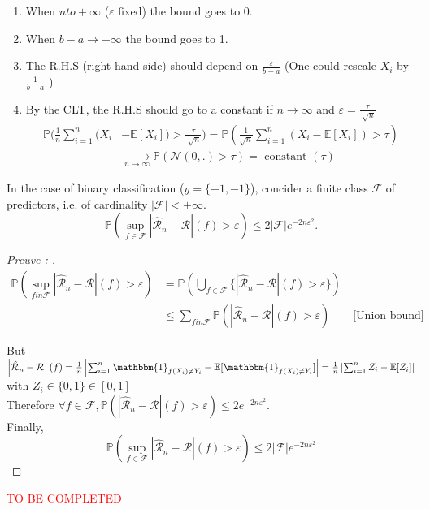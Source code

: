 \begin{enumerate}
    \item When $n to + \infty $ ($\varepsilon $ fixed) the bound goes to 0.
    \item When $b -a \to + \infty $ the bound goes to 1.
    \item The R.H.S (right hand side) should depend on $\frac{\varepsilon }{b-a}$ (One could rescale $X_i$ by $\frac{1}{b-a}$ )
    \item By the CLT, the R.H.S should go to a constant if $n \to \infty $ and $\varepsilon = \frac{\tau }{\sqrt[]{n}}$ \begin{align*}
        \mathbb{P} ( \frac{1}{n} \sum_{i=1}^{n} (X_i &- \mathbb{E}[X_i]) >  \frac{\tau }{\sqrt[]{n}}) =  \mathbb{P}( \frac{1}{\sqrt{n}} \sum_{i=1}^{n} (X_i - \mathbb{E}[X_i]) >  \tau) \\
        & \xrightarrow[n \to \infty]{} \mathbb{P}(\mathcal{N}(0, . ) > \tau ) = \text{ constant }(\tau )
    \end{align*}
\end{enumerate}

\begin{prop}[]
    In the case of binary classification ($y = \{+1, -1\}$), concider a finite class $\mathcal{F}$ of predictors, i.e. of cardinality $\left| \mathcal{F} \right| < + \infty $. 
    \[
        \mathbb{P}(\sup _{f \in  \mathcal{F}} \left| \hat{\mathcal{R}}_n - \mathcal{R} \right|(f)> \varepsilon  ) \leq 2 \left| \mathcal{F} \right| e^{-2n \varepsilon^2} 
    .\]
\end{prop}

\begin{proof}[Preuve : ]
    \begin{align*}
        \mathbb{P}(\sup_{f in \mathcal{F}} \left| \hat{\mathcal{R}}_n - \mathcal{R} \right| (f) > \varepsilon  ) 
        &= \mathbb{P} ( \bigcup _{f \in \mathcal{F}} \{ \left| \hat{\mathcal{R}}_n - \mathcal{R} \right| (f) > \varepsilon \}) \\
        & \leq \sum_{f in \mathcal{F}}^{} \mathbb{P}(\left| \hat{\mathcal{R}}_n - \mathcal{R} \right| (f) > \varepsilon ) \qquad \text{[Union bound]}
    \end{align*}

    But $\left| \hat{\mathcal{R}}_n - \mathcal{R} \right| (f) = \frac{1}{n} \left| \sum_{i=1}^{n} \mathbbm{1}_{f(X_i) \neq Y_i} - \mathbb{E}[\mathbbm{1}_{f(X_i) \neq Y_i}] \right| = \frac{1}{n} \left| \sum_{i=1}^{n} Z_i - \mathbb{E}[Z_i] \right| $ \\
    with $Z_i \in \{0, 1\} \in [0,1]$ \\
    Therefore $\forall f \in  \mathcal{F}, \mathbb{P}(\left| \hat{\mathcal{R}}_n - \mathcal{R} \right| (f) > \varepsilon ) \leq 2 e^{-2n \varepsilon ^2}$. \\
    Finally, $$\mathbb{P}(\sup _{f \in  \mathcal{F}} \left| \hat{\mathcal{R}}_n - \mathcal{R} \right|(f)> \varepsilon  ) \leq 2 \left| \mathcal{F} \right| e^{-2n \varepsilon^2} $$
\end{proof}


\textcolor{red}{TO BE COMPLETED}
